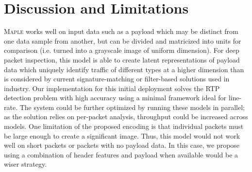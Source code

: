 \section{Discussion and Limitations}
\textsc{Maple} works well on input data such as a payload which may be distinct from one data sample from another, but can be divided and matricized into units for comparison (i.e. turned into a grayscale image of uniform dimension). For deep packet inspection, this model is able to create latent representations of payload data which uniquely identify traffic of different types at a higher dimension than is considered by current signature-matching or filter-based solutions used in industry. Our implementation for this initial deployment solves the RTP detection problem with high accuracy using a minimal framework ideal for line-rate. The system could be further optimized by running these models in parallel; as the solution relies on per-packet analysis, throughput could be increased across models. One limitation of the proposed encoding is that individual packets must be large enough to create a significant image. Thus, this model would not work well on short packets or packets with no payload data. In this case, we propose using a combination of header features and payload when available would be a wiser strategy.
